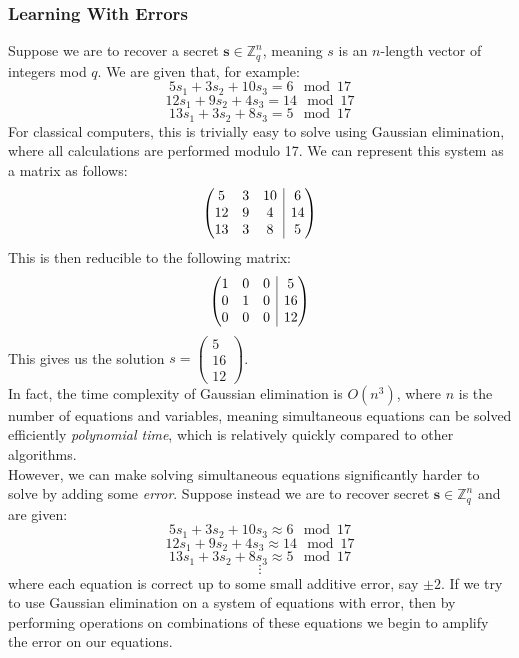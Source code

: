 \documentclass{article}
\begin{document}
\subsubsection{Learning With Errors}
Suppose we are to recover a secret $\bm{s} \in \mathbb{Z}^{n}_{q}$, meaning $s$ is an $n$-length vector of integers mod $q$.
We are given that, for example:
\[ 5s_{1} + 3s_{2} + 10s_{3} = 6 \mod{17} \] 
\[ 12s_{1} + 9s_{2} + 4s_{3} = 14 \mod{17} \] 
\[ 13s_{1} + 3s_{2} + 8s_{3} = 5 \mod{17} \] 
For classical computers, this is trivially easy to solve using Gaussian
elimination, where all calculations are performed modulo 17. We can represent
this system as a matrix as follows:
\[
\left(\begin{array}{@{}ccc|c@{}}
   5 & 3 & 10 & 6 \\
   12 & 9 & 4 & 14 \\
   13 & 3 & 8 & 5
\end{array}\right)
\]
This is then reducible to the following matrix:
\[
\left(\begin{array}{@{}ccc|c@{}}
   1 & 0 & 0 & 5 \\
   0 & 1 & 0 & 16 \\
   0 & 0 & 0 & 12
\end{array}\right)
\]
This gives us the solution $s = \begin{pmatrix} 5 \\ 16 \\ 12 \end{pmatrix}$. \\
In fact, the time complexity of Gaussian elimination is $O(n^{3})$, where $n$
is the number of equations and variables, meaning simultaneous equations can be
solved efficiently \textit{polynomial time}, which is relatively quickly
compared to other algorithms.
\\

However, we can make solving simultaneous equations significantly harder to solve by adding some \textit{error}.
Suppose instead we are to recover secret $\bm{s} \in \mathbb{Z}^{n}_{q}$ and are given:
\[ 5s_{1} + 3s_{2} + 10s_{3} \approx 6 \mod{17} \] 
\[ 12s_{1} + 9s_{2} + 4s_{3} \approx 14 \mod{17} \] 
\[ 13s_{1} + 3s_{2} + 8s_{3} \approx 5 \mod{17} \] 
\[\vdots\]
where each equation is correct up to some small additive error, say $\pm 2$. If
we try to use Gaussian elimination on a system of equations with error, then by
performing operations on combinations of these equations we begin to amplify
the error on our equations.
\medskip
\end{document}
